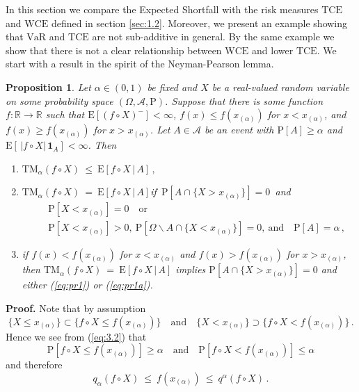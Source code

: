 \documentclass[11pt,a4paper,leqno]{article}
\newtheorem{proposition}[theorem]{Proposition}
\begin{document}
In this section we compare the Expected Shortfall with the risk measures
$\mathrm{TCE}$ and $\mathrm{WCE}$ defined in section \ref{sec:1.2}. 
Moreover, we present an example showing that $\mathrm{VaR}$ and $\mathrm{TCE}$ 
are not sub-additive in general. By the same example we show that
there is not a clear relationship between $\mathrm{WCE}$ and lower $\mathrm{TCE}$.
We start with a result in the spirit of the Neyman-Pearson lemma.

\begin{proposition}
  \label{pr:ineq}
Let $\alpha \in (0,1)$ be fixed and $X$ be a real-valued random variable on some
probability space $(\Omega, \mathcal{A}, \mathrm{P})$. Suppose that
there is some function $f:\mathbb{R}\to\mathbb{R}$ such that
$\mathrm{E}[(f\circ X)^-]<\infty$, $f(x) \le f(x_{(\alpha)})$ for $x <
x_{(\alpha)}$, and $f(x) \ge f(x_{(\alpha)})$ for $x > x_{(\alpha)}$. 
Let $A\in \mathcal{A}$ be an event with $\mathrm{P}[A]\ge \alpha$ and
$\mathrm{E}[\,|f\circ X|\,\mathbf{1}_A] < \infty$. Then
\begin{enumerate}
\item $\mathrm{TM}_\alpha(f\circ X) \ \le \ \mathrm{E}[f\circ X\,|\,A]\,,$
%
\item  $\mathrm{TM}_\alpha(f\circ X) \ = \ \mathrm{E}[ f\circ X\,|\,A]$\quad if\
$\mathrm{P}[A\cap \{X > x_{(\alpha)}\}] = 0$\ and
  \begin{eqnarray}
    \label{eq:pr1}
&&\mathrm{P}[X < x_{(\alpha)}] = 0 \quad \mbox{or} \\
&&\mathrm{P}[X < x_{(\alpha)}] > 0,\ \mathrm{P}[\Omega \backslash A \cap \{X <
x_{(\alpha)}\}] = 0, \ \mbox{and}\quad \mathrm{P}[A]=\alpha\,,
\label{eq:pr1a}
  \end{eqnarray}
%
\item if $f(x) < f(x_{(\alpha)})$ for $x <
x_{(\alpha)}$ and $f(x) > f(x_{(\alpha)})$ for $x > x_{(\alpha)}$, then
$\mathrm{TM}_\alpha(f\circ X) \ = \ \mathrm{E}[ f\circ X\,|\,A]$  implies
$\mathrm{P}[A\cap \{X > x_{(\alpha)}\}] = 0$ and either 
(\ref{eq:pr1}) or (\ref{eq:pr1a}).
\end{enumerate}
\end{proposition}
%
\textbf{Proof.} Note that by assumption 
$$
\{X \le x_{(\alpha)}\} \subset \{f\circ X \le f(x_{(\alpha)})\}\quad
\mbox{and}\quad \{X < x_{(\alpha)}\} \supset \{f\circ X < f(x_{(\alpha)})\}\,.
$$
Hence we see from (\ref{eq:3.2}) that 
$$\mathrm{P}[f\circ X \le f(x_{(\alpha)})] \ge \alpha\quad \mbox{and}\quad
\mathrm{P}[f\circ X < f(x_{(\alpha)})] \le \alpha
$$
and therefore 
\begin{equation}\label{eq:pr2}
q_{\alpha}(f\circ X)\ \le \ f(x_{(\alpha)})\ \le \ q^{\alpha}(f\circ X)\,.
\end{equation}
\end{document}
